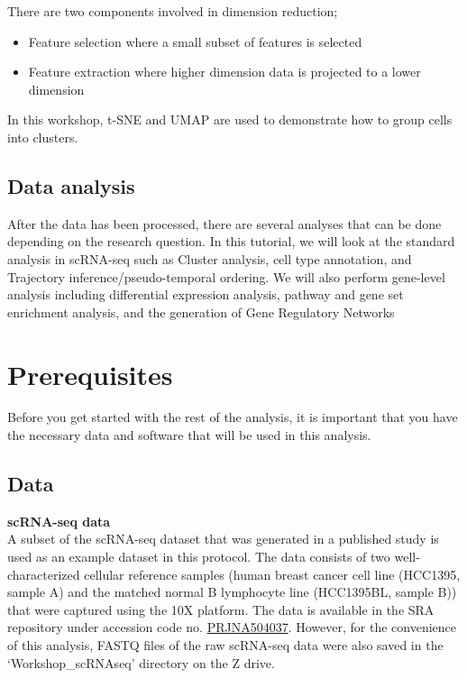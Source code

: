 \documentclass[
  openany]{book}
\providecommand{\tightlist}{%
  \setlength{\itemsep}{0pt}\setlength{\parskip}{0pt}}
\begin{document}
There are two components involved in dimension reduction;

\begin{itemize}
\tightlist
\item
  Feature selection where a small subset of features is selected
\item
  Feature extraction where higher dimension data is projected to a lower dimension
\end{itemize}

In this workshop, t-SNE and UMAP are used to demonstrate how to group cells into clusters.

\hypertarget{data-analysis}{%
\section{Data analysis}\label{data-analysis}}

After the data has been processed, there are several analyses that can be done depending on the research question. In this tutorial, we will look at the standard analysis in scRNA-seq such as Cluster analysis, cell type annotation, and Trajectory inference/pseudo-temporal ordering. We will also perform gene-level analysis including differential expression analysis, pathway and gene set enrichment analysis, and the generation of Gene Regulatory Networks
\vspace{-100pt}

\vspace{-100pt}

\hypertarget{prerequisites}{%
\chapter{Prerequisites}\label{prerequisites}}

Before you get started with the rest of the analysis, it is important that you have the necessary data and software that will be used in this analysis.

\hypertarget{prereq}{%
\section{Data}\label{prereq}}

\textbf{scRNA-seq data}\\

A subset of the scRNA-seq dataset that was generated in a published study \citep{chen2020multicenter} is used as an example dataset in this protocol. The data consists of two well-characterized cellular reference samples (human breast cancer cell line (HCC1395, sample A) and the matched normal B lymphocyte line (HCC1395BL, sample B)) that were captured using the 10X platform. The data is available in the SRA repository under accession code no. \href{https://www.ncbi.nlm.nih.gov/bioproject/?term=PRJNA504037}{PRJNA504037}. However, for the convenience of this analysis, FASTQ files of the raw scRNA-seq data were also saved in the `Workshop\_scRNAseq' directory on the Z drive.
\end{document}
